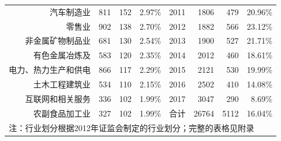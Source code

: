 \documentclass{article}
\begin{document}
\begin{table}[htbp]
\begin{tabular}{rrrr|rrrr}
    汽车制造业 & \multicolumn{1}{r}{811} & \multicolumn{1}{r}{152} & \multicolumn{1}{r}{2.97\%} & \multicolumn{1}{r}{2011} & \multicolumn{1}{r}{1806} & \multicolumn{1}{r}{479} & \multicolumn{1}{r}{20.96\%} \\
    零售业   & \multicolumn{1}{r}{902} & \multicolumn{1}{r}{138} & \multicolumn{1}{r}{2.70\%} & \multicolumn{1}{r}{2012} & \multicolumn{1}{r}{1882} & \multicolumn{1}{r}{566} & \multicolumn{1}{r}{23.12\%} \\
    非金属矿物制品业 & \multicolumn{1}{r}{681} & \multicolumn{1}{r}{130} & \multicolumn{1}{r}{2.54\%} & \multicolumn{1}{r}{2013} & \multicolumn{1}{r}{1900} & \multicolumn{1}{r}{527} & \multicolumn{1}{r}{21.71\%} \\
    有色金属冶炼及 & \multicolumn{1}{r}{583} & \multicolumn{1}{r}{120} & \multicolumn{1}{r}{2.35\%} & \multicolumn{1}{r}{2014} & \multicolumn{1}{r}{2012} & \multicolumn{1}{r}{460} & \multicolumn{1}{r}{18.61\%} \\
    电力、热力生产和供电 & \multicolumn{1}{r}{866} & \multicolumn{1}{r}{117} & \multicolumn{1}{r}{2.29\%} & \multicolumn{1}{r}{2015} & \multicolumn{1}{r}{2121} & \multicolumn{1}{r}{530} & \multicolumn{1}{r}{19.99\%} \\
    土木工程建筑业 & \multicolumn{1}{r}{534} & \multicolumn{1}{r}{110} & \multicolumn{1}{r}{2.15\%} & \multicolumn{1}{r}{2016} & \multicolumn{1}{r}{2502} & \multicolumn{1}{r}{410} & \multicolumn{1}{r}{14.08\%} \\
    互联网和相关服务 & \multicolumn{1}{r}{336} & \multicolumn{1}{r}{102} & \multicolumn{1}{r}{1.99\%} & \multicolumn{1}{r}{2017} & \multicolumn{1}{r}{3047} & \multicolumn{1}{r}{290} & \multicolumn{1}{r}{8.69\%} \\
    农副食品加工业 & \multicolumn{1}{r}{327} & \multicolumn{1}{r}{102} & \multicolumn{1}{r}{1.99\%} & 合计    & \multicolumn{1}{r}{26764} & \multicolumn{1}{r}{5112} & \multicolumn{1}{r}{16.04\%} \\ \hline
    \multicolumn{8}{l}{注：行业划分根据2012年证监会制定的行业划分；完整的表格见附录} \\ \hline\hline
    \end{tabular}%
  \label{tab:ViolationInDetails}%
\end{table}%
\end{document}
